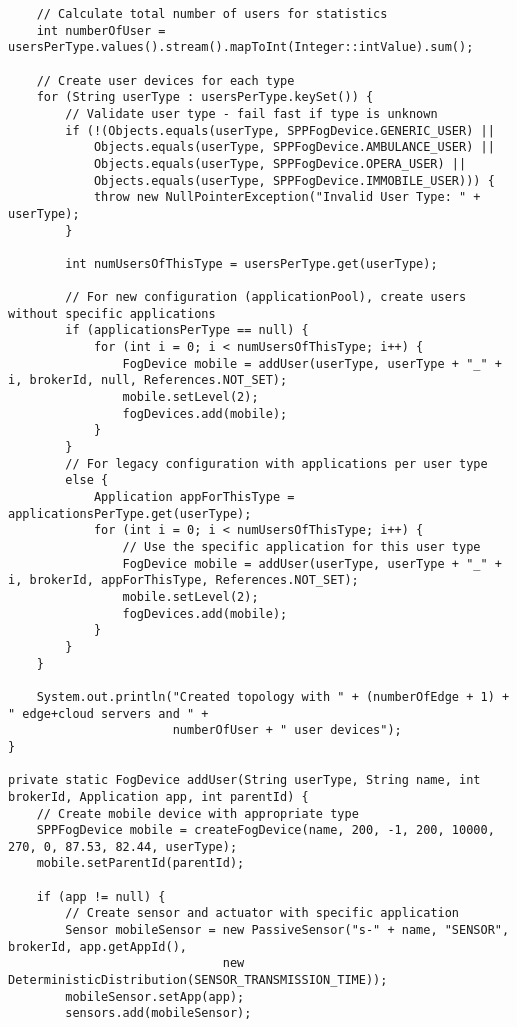 \begin{verbatim}
    // Calculate total number of users for statistics
    int numberOfUser = usersPerType.values().stream().mapToInt(Integer::intValue).sum();

    // Create user devices for each type
    for (String userType : usersPerType.keySet()) {
        // Validate user type - fail fast if type is unknown
        if (!(Objects.equals(userType, SPPFogDevice.GENERIC_USER) ||
            Objects.equals(userType, SPPFogDevice.AMBULANCE_USER) ||
            Objects.equals(userType, SPPFogDevice.OPERA_USER) ||
            Objects.equals(userType, SPPFogDevice.IMMOBILE_USER))) {
            throw new NullPointerException("Invalid User Type: " + userType);
        }

        int numUsersOfThisType = usersPerType.get(userType);
        
        // For new configuration (applicationPool), create users without specific applications
        if (applicationsPerType == null) {
            for (int i = 0; i < numUsersOfThisType; i++) {
                FogDevice mobile = addUser(userType, userType + "_" + i, brokerId, null, References.NOT_SET);
                mobile.setLevel(2);
                fogDevices.add(mobile);
            }
        }
        // For legacy configuration with applications per user type
        else {
            Application appForThisType = applicationsPerType.get(userType);
            for (int i = 0; i < numUsersOfThisType; i++) {
                // Use the specific application for this user type
                FogDevice mobile = addUser(userType, userType + "_" + i, brokerId, appForThisType, References.NOT_SET);
                mobile.setLevel(2);
                fogDevices.add(mobile);
            }
        }
    }
    
    System.out.println("Created topology with " + (numberOfEdge + 1) + " edge+cloud servers and " + 
                       numberOfUser + " user devices");
}

private static FogDevice addUser(String userType, String name, int brokerId, Application app, int parentId) {
    // Create mobile device with appropriate type
    SPPFogDevice mobile = createFogDevice(name, 200, -1, 200, 10000, 270, 0, 87.53, 82.44, userType);
    mobile.setParentId(parentId);
    
    if (app != null) {
        // Create sensor and actuator with specific application
        Sensor mobileSensor = new PassiveSensor("s-" + name, "SENSOR", brokerId, app.getAppId(), 
                              new DeterministicDistribution(SENSOR_TRANSMISSION_TIME));
        mobileSensor.setApp(app);
        sensors.add(mobileSensor);
        

\end{verbatim}
